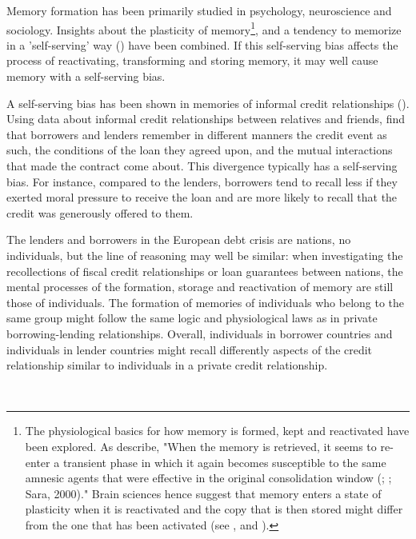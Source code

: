 Memory formation has been primarily studied in psychology, neuroscience and sociology.
Insights about the plasticity of memory\footnote{%
The physiological basics for how memory is formed, kept and reactivated have
been explored. As \cite{dudai2016} describe, "When the memory
is retrieved, it seems to re-enter a transient phase in which it again
becomes susceptible to the same amnesic agents that were effective in the
original consolidation window (\cite{dudai}; \cite{nader}; Sara,
2000)." Brain sciences hence suggest that memory enters a state of
plasticity when it is reactivated and the copy that is then stored might
differ from the one that has been activated (see \cite{agren}, and \cite{lee}).}, and a tendency to memorize in a 'self-serving' way
(\cite{bell}) have been combined. If this self-serving bias
affects the process of reactivating, transforming and storing memory, it may well
cause memory with a self-serving bias.

A self-serving bias has been shown in memories of informal credit relationships (\cite{dezso}). Using data about informal credit
relationships between relatives and friends, \cite{dezso} find that borrowers and lenders remember in different manners the credit event
as such, the conditions of the loan they agreed upon, and the mutual
interactions that made the contract come about. This divergence typically
has a self-serving bias. For instance, compared to the lenders, borrowers
tend to recall less if they exerted moral pressure to receive the loan and
are more likely to recall that the credit was generously offered to them.

The lenders and borrowers in the European debt crisis are
nations, no individuals, but the line of reasoning may well be
similar: when investigating the recollections of fiscal credit relationships or
loan guarantees between nations, the mental processes of the formation,
storage and reactivation of memory are still those of individuals.
The formation of memories of individuals who belong to the same group might
follow the same logic and physiological laws as in private
borrowing-lending relationships. Overall, individuals in borrower
countries and individuals in lender countries might recall differently
aspects of the credit relationship similar to individuals in a private credit relationship. 

\\

